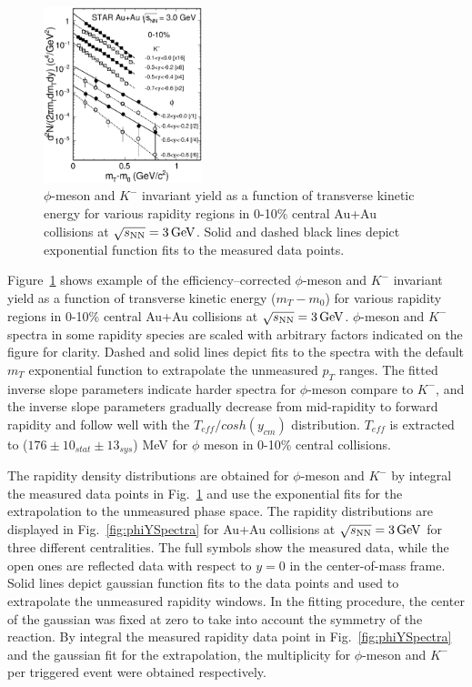 \documentclass[%
 reprint,	
showpacs,
 amsmath,amssymb,
 aps,
 prc,
]{revtex4-1}
\begin{document}
\begin{figure}
\centering
\includegraphics[width=0.41\textwidth]{fig/fig2_h_mT_spectra_phiMeson.eps}
  \caption{ $\phi$-meson and $K^-$ invariant yield as a function of transverse kinetic energy for various rapidity regions in 0-10\% central Au+Au collisions at ${\sqrt{s_{\rm NN}} = \rm{3\,GeV}}$. Solid and dashed black lines depict exponential function fits to the measured data points.}
\label{fig:phimTSpectra} 
\end{figure}

Figure~\ref{fig:phimTSpectra} shows example of the efficiency--corrected $\phi$-meson and $K^-$ invariant yield as a function of transverse kinetic energy ($m_T-m_0$) for various rapidity regions in 0-10\% central Au+Au collisions at ${\sqrt{s_{\rm NN}} = \rm{3\,GeV}}$. $\phi$-meson and $K^-$ spectra in some rapidity species are scaled with arbitrary factors indicated on the figure for clarity. Dashed and solid lines depict fits to the spectra with the default $m_T$ exponential function to extrapolate the unmeasured $p_T$ ranges. The fitted inverse slope parameters indicate harder spectra for $\phi$-meson compare to $K^-$, and the inverse slope parameters gradually decrease from mid-rapidity to forward rapidity and follow well with the $T_{eff}/cosh(y_{cm})$ distribution. $T_{eff}$ is extracted to ($176\pm10_{stat}\pm13_{sys}$) MeV for $\phi$ meson in 0-10\% central collisions.



The rapidity density distributions are obtained for $\phi$-meson and $K^-$ by integral the measured data points in Fig.~\ref{fig:phimTSpectra} and use the exponential fits for the extrapolation to the unmeasured phase space. The rapidity distributions are displayed in Fig.~\ref{fig:phiYSpectra} for Au+Au collisions at ${\sqrt{s_{\rm NN}} = \rm{3\,GeV}}$ for three different centralities. The full symbols show the measured data, while the open ones are reflected data with respect to $y=0$ in the center-of-mass frame. Solid lines depict gaussian function fits to the data points and used to extrapolate the unmeasured rapidity windows. In the fitting procedure, the center of the gaussian was fixed at zero to take into account the symmetry of the reaction. By integral the measured rapidity data point in Fig.~\ref{fig:phiYSpectra} and the gaussian fit for the extrapolation, the multiplicity for $\phi$-meson and $K^-$ per triggered event were obtained respectively.
\end{document}
